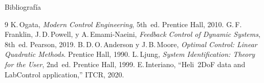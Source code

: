 \documentclass[mathserif,spanish,10pt]{beamer}
\begin{document}
\begin{frame}[allowframebreaks]{Bibliografía}
  \footnotesize
  \begin{thebibliography}{9}
      K.\,Ogata,
      \emph{Modern Control Engineering}, 5th~ed.
      Prentice Hall, 2010.
      G.\,F.\,Franklin, J.\,D.\,Powell, y A.\,Emami-Naeini,
      \emph{Feedback Control of Dynamic Systems}, 8th~ed.
      Pearson, 2019.
      B.\,D.\,O.\,Anderson y J.\,B.\,Moore,
      \emph{Optimal Control: Linear Quadratic Methods}.
      Prentice Hall, 1990.
      L.\,Ljung,
      \emph{System Identification: Theory for the User}, 2nd~ed.
      Prentice Hall, 1999.
      E.\,Interiano,
      ``Heli~2DoF data and LabControl application,''
      ITCR, 2020.
  \end{thebibliography}
\end{frame}
\end{document}
